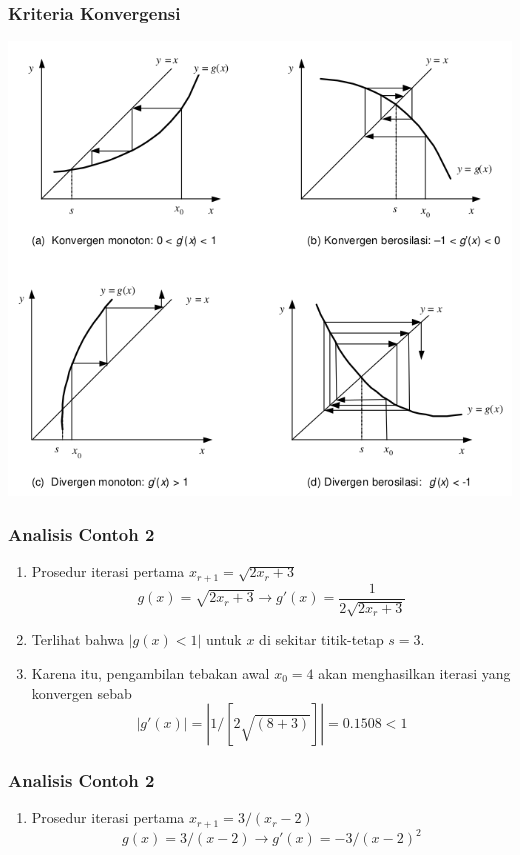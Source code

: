\documentclass[pdflatex,compress]{beamer}
\begin{document}
\begin{frame}
	\frametitle{Kriteria Konvergensi}
	\begin{center}
		\includegraphics[height=0.8\textheight]{img/img13}
	\end{center}
\end{frame}

\begin{frame}
	\frametitle{Analisis Contoh 2}
	\begin{enumerate}
		\item Prosedur iterasi pertama $ x_{r+1} = \sqrt{2x_r + 3} $
		\[ g(x) =  \sqrt{2x_r + 3} \rightarrow g'(x) =  \frac{1}{2\sqrt{2x_r + 3}} \]
		\item[] Terlihat bahwa $ |g(x) < 1| $ untuk $ x $ di sekitar titik-tetap $ s = 3 $.
		\item[] Karena itu, pengambilan tebakan awal $ x_0 = 4 $ akan menghasilkan iterasi yang konvergen sebab
		\[ |g'(x)| = |1 / [2 \sqrt{(8+3)}]| = 0.1508 < 1\]
	\end{enumerate}
\end{frame}

\begin{frame}
	\frametitle{Analisis Contoh 2}
	\begin{enumerate}
		\item Prosedur iterasi pertama $ x_{r+1} = 3/(x_r - 2) $
		\[ g(x) =  3/(x - 2) \rightarrow g'(x) =  -3/(x - 2)^2 \]
	\end{enumerate}
\end{frame}
\end{document}
